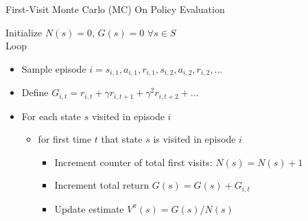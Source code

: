\begin{frame}[c]{First-Visit Monte Carlo (MC) On Policy Evaluation}

Initialize $N(s) = 0$, $G(s) = 0$ $\forall s \in S$\\
Loop 
\begin{itemize}
	\item Sample episode $i = s_{i,1}, a_{i,1}, r_{i,1}, s_{i,2}, a_{i,2}, r_{i,2}, \ldots$
	\item Define $G_{i,t} = r_{i,t} + \gamma r_{i,t+1} + \gamma^2 r_{i,t+2} + \ldots$
	\item For each state $s$ visited in episode $i$
	\begin{itemize}
		\item for first time $t$ that state $s$ is visited in episode $i$
		\begin{itemize}
			\item Increment counter of total first visits: $N(s) = N(s) + 1$
			\item Increment total return $G(s) = G(s) + G_{i,t}$
			\item Update estimate $V^\pi (s) = G(s) /N(s)$
		\end{itemize}
	\end{itemize}
\end{itemize}
	
\end{frame}

